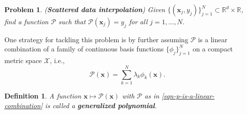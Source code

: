 \documentclass[12pt]{report} %
\newtheorem{definition}{Definition}
\newtheorem{problem}{Problem}
\newcommand{\tmmathbf}[1]{\ensuremath{\boldsymbol{#1}}}
\newcommand{\tmstrong}[1]{\textbf{#1}}
\begin{document}
\begin{problem}
({\tmstrong{Scattered data interpolation}}) Given $\{ (\tmmathbf{x}_j, y_j)
  \}_{j = 1}^N \subset \mathbb{R}^d \times \mathbb{R}$, find a function
$\mathcal{P}$ such that $\mathcal{P} (\tmmathbf{x}_j) = y_j$ for all $j = 1,
  \ldots, N$.\label{interpolationproblemstatement}
\end{problem}

One strategy for tackling this problem is by further assuming $\mathcal{P}$ is
a linear combination of a family of continuous basis functions $\{ \phi_j
  \}_{j = 1}^N$ on a compact metric space $\mathcal{X}$, i.e.,
\begin{equation}
  \mathcal{P} (\tmmathbf{x}) = \sum_{k = 1}^N \lambda_k \phi_k (\tmmathbf{x})
  . \label{eqn-p-is-a-linear-combination}
\end{equation}
\begin{definition}
  A function $\tmmathbf{x} \mapsto \mathcal{P} (\tmmathbf{x})$ with
  $\mathcal{P}$ as in \eqref{eqn-p-is-a-linear-combination} is called a
    {\tmstrong{generalized polynomial}}.
\end{definition}
\end{document}
